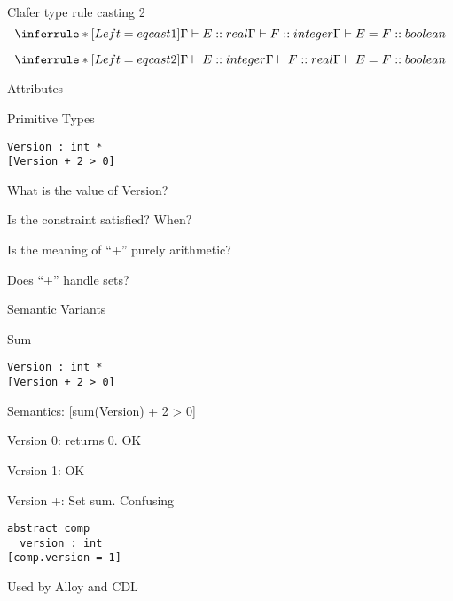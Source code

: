 \documentclass[table,15pt,t]{beamer}
\newcommand{\vmiddle}[1]{
  \vspace{\stretch{1}}
  #1
  \vspace{\stretch{1}}
}
\newcommand{\interframe}[1]{
\begin{frame}{}
\vmiddle{\hmiddle{\Huge #1}}
\end{frame}
}
\newcommand{\hmiddle}[1]{
  \begin{center}#1\end{center}
}
\begin{document}
\begin{frame}[fragile,c]{Clafer type rule casting 2}
\begin{equation*}
\inferrule* [Left=eqcast1] {\Gamma\vdash E::real \\ \Gamma\vdash F::integer}{\Gamma\vdash E = F::boolean}
\end{equation*}

\begin{equation*}
\inferrule* [Left=eqcast2] {\Gamma\vdash E::integer \\ \Gamma\vdash F::real}{\Gamma\vdash E = F::boolean}
\end{equation*}
\end{frame}


\interframe{Attributes}

\begin{frame}[fragile,c]{Primitive Types}
\begin{lstlisting}
Version : int *
[Version + 2 > 0]
\end{lstlisting}\pause
\begin{list}{}{}
    \item What is the value of Version?\pause
    \item Is the constraint satisfied? When?\pause
    \item Is the meaning of ``+'' purely arithmetic?\pause
    \item Does ``+'' handle sets?
\end{list}
\end{frame}

\interframe{Semantic Variants}

\begin{frame}[fragile,c]{Sum}
\begin{lstlisting}
Version : int *
[Version + 2 > 0]
\end{lstlisting}
\begin{list}{}{}
    \item Semantics: [sum(Version) + 2 > 0]\pause
    \item Version 0: returns 0. OK
    \item Version 1: OK
    \item Version +: Set sum. Confusing
\end{list}\pause
\begin{lstlisting}
abstract comp
  version : int
[comp.version = 1]
\end{lstlisting}\pause
Used by Alloy and CDL
\end{frame}
\end{document}
